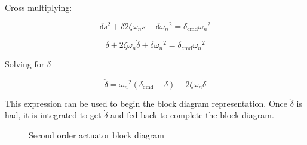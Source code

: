 Cross multiplying:

\begin{equation*}
  \delta s^{2}+\delta2\zeta\omega_{n}s+\delta{\omega_{n}}^{2}=\delta_{\text{cmd}}{\omega_{n}}^{2}
\end{equation*}

\begin{equation*}
  \ddot{\delta}+2\zeta\omega_{n}\dot{\delta}+\delta{\omega_{n}}^{2}=\delta_{\text{cmd}}{\omega_{n}}^{2}
\end{equation*}

Solving for $\ddot{\delta}$

\begin{equation*}
  \ddot{\delta}={\omega_{n}}^{2}(\delta_{\text{cmd}}-\delta)-2\zeta\omega_{n}\dot{\delta}
\end{equation*}

This expression can be used to begin the block diagram representation.
Once $\ddot{\delta}$ is had, it is integrated to get $\dot{\delta}$ and fed back to complete the block diagram.

\begin{figure}[H]
  \begin{center}
    \caption{Second order actuator block diagram\label{label_fig}}
  \end{center}
\end{figure}
